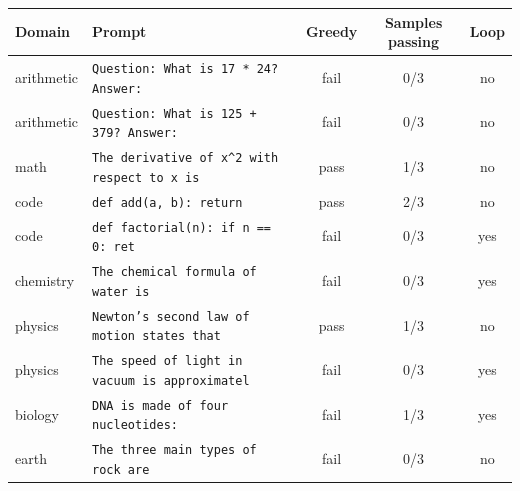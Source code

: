 \begin{tabular}{llccc}
\toprule
Domain & Prompt & Greedy & Samples passing & Loop \\
\midrule
arithmetic & \texttt{Question: What is 17 * 24? Answer:} & fail & 0/3 & no \\
arithmetic & \texttt{Question: What is 125 + 379? Answer:} & fail & 0/3 & no \\
math & \texttt{The derivative of x\textasciicircum{}2 with respect to x is} & pass & 1/3 & no \\
code & \texttt{def add(a, b):     return} & pass & 2/3 & no \\
code & \texttt{def factorial(n):     if n == 0:         ret} & fail & 0/3 & yes \\
chemistry & \texttt{The chemical formula of water is} & fail & 0/3 & yes \\
physics & \texttt{Newton's second law of motion states that} & pass & 1/3 & no \\
physics & \texttt{The speed of light in vacuum is approximatel} & fail & 0/3 & yes \\
biology & \texttt{DNA is made of four nucleotides:} & fail & 1/3 & yes \\
earth & \texttt{The three main types of rock are} & fail & 0/3 & no \\
\bottomrule
\end{tabular}
